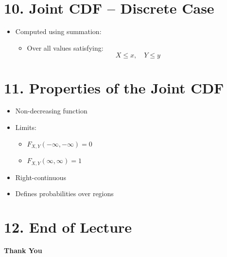 \documentclass[12pt]{article}
\begin{document}
\section*{10. Joint CDF -- Discrete Case}

\begin{itemize}
    \item Computed using summation:
    \begin{itemize}
        \item Over all values satisfying:
        \[
        X \le x, \quad Y \le y
        \]
    \end{itemize}
\end{itemize}

\section*{11. Properties of the Joint CDF}

\begin{itemize}
    \item Non-decreasing function
    \item Limits:
    \begin{itemize}
        \item $F_{X,Y}(-\infty, -\infty) = 0$
        \item $F_{X,Y}(\infty, \infty) = 1$
    \end{itemize}
    \item Right-continuous
    \item Defines probabilities over regions
\end{itemize}

\section*{12. End of Lecture}

\textbf{Thank You}
\end{document}
